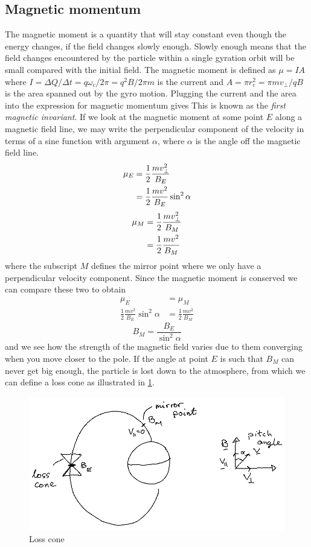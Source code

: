 \subsection{Magnetic momentum}
The magnetic moment is a quantity that will stay constant even though the energy changes, if the field changes slowly enough. Slowly enough means that the field changes encountered by the particle within a single gyration orbit will be small compared with the initial field. The magnetic moment is defined as \(\mu=IA\) where \(I=\Delta Q/\Delta t=q\omega_c/2\pi=q^2B/2\pi m\) is the current and \(A=\pi r_c^2=\pi mv_\perp/qB\) is the area spanned out by the gyro motion. Plugging the current and the area into the expression for magnetic momentum gives
This is known as the \emph{first magnetic invariant}. If we look at the magnetic moment at some point \(E\) along a magnetic field line, we may write the perpendicular component of the velocity in terms of a sine function with argument \(\alpha \), where \(\alpha \) is the angle off the magnetic field line.
\begin{align}
    \mu_E&=\frac{1}{2}\frac{mv_\perp^2}{B_E}\notag \\
    &=\frac{1}{2}\frac{mv^2}{B_E}\sin^2\alpha
\end{align}
\begin{align}
    \mu_M&=\frac{1}{2}\frac{mv_\perp^2}{B_M}\notag \\
    &=\frac{1}{2}\frac{mv^2}{B_M}
\end{align}
where the subscript \(M\) defines the mirror point where we only have a perpendicular velocity component. Since the magnetic moment is conserved we can compare these two to obtain
\begin{align*}
    \mu_E&=\mu_M\\
    \frac{1}{2}\frac{mv^2}{B_E}\sin^2\alpha&=\frac{1}{2}\frac{mv^2}{B_M}
\end{align*}
\begin{equation}
    B_M=\frac{B_E}{\sin^2\alpha}
\end{equation}
and we see how the strength of the magnetic field varies due to them converging when you move closer to the pole. If the angle at point \(E\) is such that \(B_M\) can never get big enough, the particle is lost down to the atmosphere, from which we can define a loss cone as illustrated in \cref{fig:loss_cone}.
\begin{figure}[t]
    \centering
    \includegraphics[width=.6\linewidth]{bilder/loss_cone.png}
    \caption{Loss cone}\label{fig:loss_cone}
\end{figure}

